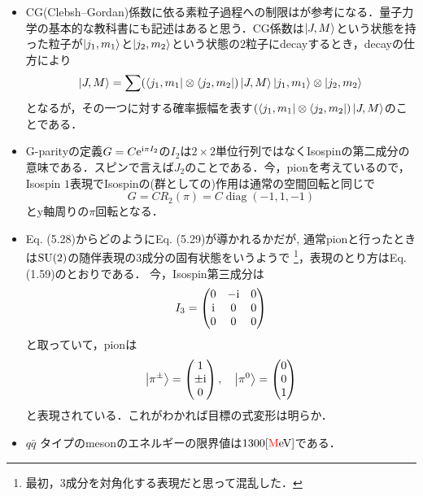 \begin{itemize}
		\item CG(Clebsh--Gordan)係数に依る素粒子過程への制限は\cite[Chap.4]{BB03663366}が参考になる．量子力学の基本的な教科書にも記述はあると思う．CG係数は$\ket{J, M} $という状態を持った粒子が$\ket{j_1, m_1} $と$\ket{j_2, m_2} $という状態の$2 $粒子にdecayするとき，decayの仕方により
				\begin{equation}
						\ket{J, M} = \sum (\bra{j_1, m_1}\otimes\bra{j_2, m_2})\ket{J, M} \ket{j_1, m_1}\otimes\ket{j_2, m_2}
				\end{equation}
				となるが，その一つに対する確率振幅を表す$ (\bra{j_1, m_1}\otimes\bra{j_2, m_2})\ket{J, M}$のことである．
		\item G-parityの定義$G = C\mathrm{e}^{\mathrm{i}\pi I_2} $の$I_2 $は$2\times 2 $単位行列ではなくIsospinの第二成分の意味である．スピンで言えば$J_2 $のことである．今，pionを考えているので，Isospin $1 $表現でIsospinの(群としての)作用は通常の空間回転と同じで
				\begin{equation}
						G = CR_2(\pi)  = C\operatorname{diag}(-1, 1, -1)
				\end{equation}
				とy軸周りの$\pi $回転となる．
		\item Eq. (5.28)からどのようにEq. (5.29)が導かれるかだが,
				通常pionと行ったときは$\mathrm{SU}(2) $の随伴表現の$3 $成分の固有状態をいうようで
				\footnote{最初，$3 $成分を対角化する表現だと思って混乱した．}\cite{Bransden2015}，表現のとり方はEq. (1.59)のとおりである．
				今，Isospin第三成分は
				\begin{equation}
						I_3 = \begin{pmatrix}
								0 & -\mathrm{i} & 0\\
								\mathrm{i} & 0 & 0\\
								0 & 0 & 0
						\end{pmatrix}
				\end{equation}
				と取っていて，pionは
				\begin{equation}
						\ket{\pi^{\pm}} = 
						\begin{pmatrix}
								1\\\pm \mathrm{i}\\0
						\end{pmatrix},\quad
						\ket{\pi^{0}} = 
						\begin{pmatrix}
								0\\0\\1
						\end{pmatrix}
				\end{equation}
				と表現されている．これがわかれば目標の式変形は明らか．
		\item $q\bar{q} $ タイプのmesonのエネルギーの限界値は$1300\mathrm{[\textcolor{red}{M}eV]} $である．
\end{itemize}
